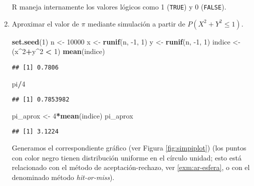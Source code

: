 \documentclass[
]{book}
\newenvironment{Shaded}{\begin{snugshade}}{\end{snugshade}}
\newcommand{\DecValTok}[1]{\textcolor[rgb]{0.00,0.00,0.81}{#1}}
\newcommand{\KeywordTok}[1]{\textcolor[rgb]{0.13,0.29,0.53}{\textbf{#1}}}
\newcommand{\NormalTok}[1]{#1}
\newcommand{\OperatorTok}[1]{\textcolor[rgb]{0.81,0.36,0.00}{\textbf{#1}}}
\newcommand{\StringTok}[1]{\textcolor[rgb]{0.31,0.60,0.02}{#1}}
\theoremstyle{break}
\theoremstyle{definition}
\theoremstyle{definition}
\theoremstyle{definition}
\theoremstyle{remark}
\begin{document}
\begin{enumerate}
  \iffalse{} {Nota: } \fi{}R maneja internamente los valores lógicos como 1 (\texttt{TRUE}) y 0 (\texttt{FALSE}).

\item
  Aproximar el valor de \(\pi\) mediante simulación a partir de
  \(P\left( X^2 +Y^2 \leq 1 \right)\).

\begin{Shaded}
\begin{Highlighting}[]
\KeywordTok{set.seed}\NormalTok{(}\DecValTok{1}\NormalTok{)}
\NormalTok{n <-}\StringTok{ }\DecValTok{10000}
\NormalTok{x <-}\StringTok{ }\KeywordTok{runif}\NormalTok{(n, }\DecValTok{-1}\NormalTok{, }\DecValTok{1}\NormalTok{)}
\NormalTok{y <-}\StringTok{ }\KeywordTok{runif}\NormalTok{(n, }\DecValTok{-1}\NormalTok{, }\DecValTok{1}\NormalTok{)}
\NormalTok{indice <-}\StringTok{ }\NormalTok{(x}\OperatorTok{^}\DecValTok{2}\OperatorTok{+}\NormalTok{y}\OperatorTok{^}\DecValTok{2} \OperatorTok{<}\StringTok{ }\DecValTok{1}\NormalTok{)}
\KeywordTok{mean}\NormalTok{(indice)}
\end{Highlighting}
\end{Shaded}

\begin{verbatim}
## [1] 0.7806
\end{verbatim}

\begin{Shaded}
\begin{Highlighting}[]
\NormalTok{pi}\OperatorTok{/}\DecValTok{4}
\end{Highlighting}
\end{Shaded}

\begin{verbatim}
## [1] 0.7853982
\end{verbatim}

\begin{Shaded}
\begin{Highlighting}[]
\NormalTok{pi_aprox <-}\StringTok{ }\DecValTok{4}\OperatorTok{*}\KeywordTok{mean}\NormalTok{(indice)}
\NormalTok{pi_aprox}
\end{Highlighting}
\end{Shaded}

\begin{verbatim}
## [1] 3.1224
\end{verbatim}

  Generamos el correspondiente gráfico (ver Figura \ref{fig:simpiplot}) (los puntos con color negro tienen distribución uniforme en el círculo unidad; esto está relacionado con el método de aceptación-rechazo, ver \ref{exm:ar-esfera}, o con el denominado método \emph{hit-or-miss}).


\end{enumerate}
\end{document}

